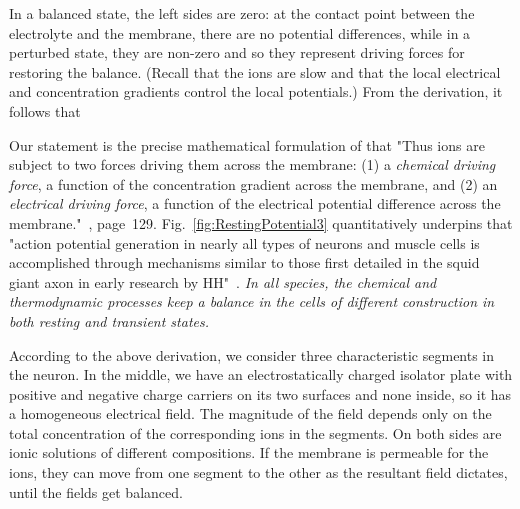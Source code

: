 In a balanced state, the left sides are zero: at the contact point between the electrolyte and the membrane,
there are no potential differences, while in a perturbed state, they are non-zero and so they represent driving forces for restoring the balance. (Recall that the ions are slow and that the local electrical and concentration gradients control the local potentials.)
From the derivation, it follows that
\else

\fi



\ifx\magyar\undefined
Our statement is the precise mathematical formulation of that
"Thus ions are subject to two forces
driving them across the membrane: (1) a \textit{chemical
	driving force}, a function of the concentration gradient
across the membrane, and (2) an \textit{electrical driving force},
a function of the electrical potential difference across
the membrane."~\cite{PrinciplesNeuralScience:2013}, page~129.
Fig.~\ref{fig:RestingPotential3} quantitatively underpins that "action potential generation in nearly all types of neurons and muscle cells is accomplished through mechanisms similar to those first detailed in the squid giant axon in early research by \gls{HH}"~\cite{MembranePotentialMoleculesNetworks:2014}. \textit{In all species, the chemical and thermodynamic processes keep a balance in the cells of different construction in both resting
	and transient states.}

According to the above derivation, we consider three characteristic segments in the neuron. In the middle, we have an electrostatically charged isolator plate with positive and negative charge carriers on its two surfaces and none inside, so it has a homogeneous electrical field. The magnitude of the field depends only on the total concentration of the corresponding ions in the segments. On both sides are ionic solutions of different compositions. If the membrane is permeable for the ions, they can move from one segment to the other as the resultant field dictates,
until the fields get balanced.
\else

